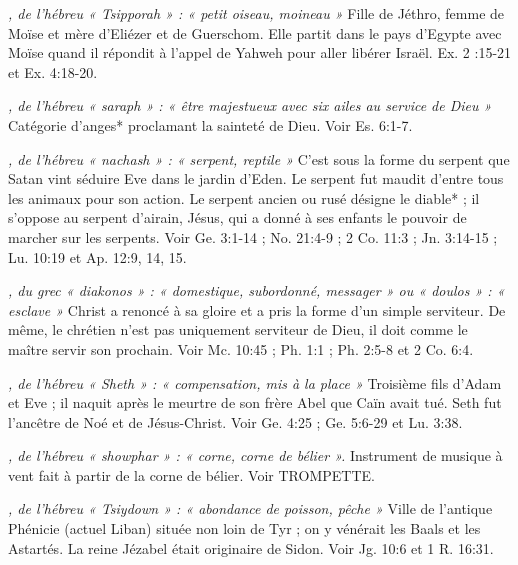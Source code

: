 \begin{multicols}{2}
\textit{, de l'hébreu « Tsipporah » : « petit oiseau, moineau »}\newline
Fille de Jéthro, femme de Moïse et mère d'Eliézer et de Guerschom. Elle partit dans le pays d'Egypte avec Moïse quand il répondit à l'appel de Yahweh pour aller libérer Israël. Ex. 2 :15-21 et Ex. 4:18-20.

\textit{, de l'hébreu « saraph » : « être majestueux avec six ailes au service de Dieu »}\newline
Catégorie d'anges* proclamant la sainteté de Dieu. Voir Es. 6:1-7.

\textit{, de l'hébreu « nachash » : « serpent, reptile »}\newline
C'est sous la forme du serpent que Satan vint séduire Eve dans le jardin d'Eden. Le serpent fut maudit d'entre tous les animaux pour son action. Le serpent ancien ou rusé désigne le diable* ; il s'oppose au serpent d'airain, Jésus, qui a donné à ses enfants le pouvoir de marcher sur les serpents. Voir Ge. 3:1-14 ; No. 21:4-9 ; 2 Co. 11:3 ; Jn. 3:14-15 ; Lu. 10:19 et Ap. 12:9, 14, 15.

\textit{, du grec « diakonos » : « domestique, subordonné, messager » ou « doulos » : « esclave »}\newline
Christ a renoncé à sa gloire et a pris la forme d'un simple serviteur. De même, le chrétien n'est pas uniquement serviteur de Dieu, il doit comme le maître servir son prochain. Voir Mc. 10:45 ; Ph. 1:1 ; Ph. 2:5-8 et 2 Co. 6:4.

\textit{, de l'hébreu « Sheth » : « compensation, mis à la place »}\newline
Troisième fils d'Adam et Eve ; il naquit après le meurtre de son frère Abel que Caïn avait tué. Seth fut l'ancêtre de Noé et de Jésus-Christ. Voir Ge. 4:25 ; Ge. 5:6-29 et Lu. 3:38.

\textit{, de l'hébreu « showphar » : « corne, corne de bélier ».}\newline
Instrument de musique à vent fait à partir de la corne de bélier. Voir TROMPETTE.

\textit{, de l'hébreu « Tsiydown » : « abondance de poisson, pêche »}\newline
Ville de l'antique Phénicie (actuel Liban) située non loin de Tyr ; on y vénérait les Baals et les Astartés. La reine Jézabel était originaire de Sidon. Voir Jg. 10:6 et 1 R. 16:31.


\end{multicols}
